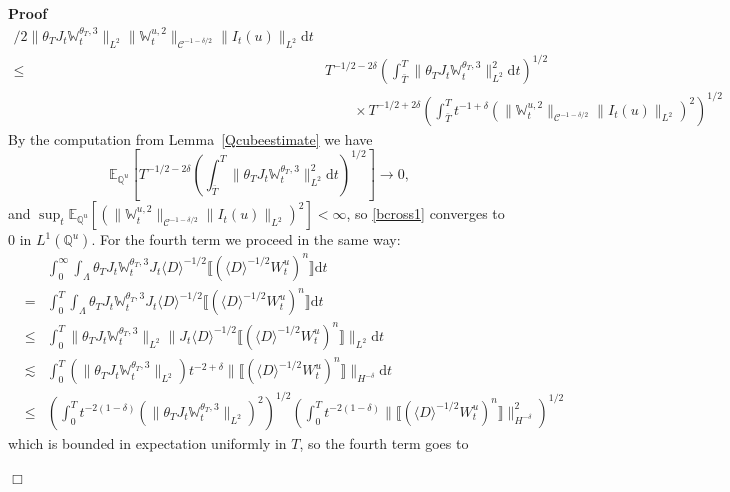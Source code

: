 \documentclass[11pt]{article}
\newcommand{\mathd}{\mathrm{d}}
\newenvironment{proof}{\noindent\textbf{Proof\ }}{\hspace*{\fill}$\Box$\medskip}
\begin{document}
\begin{proof}
\begin{equation}
\begin{array}{ll}
{      / 2} \| \theta_T J_t \mathbb{W}_t^{\theta_T, 3} \|_{L^2}  \|
      \mathbb{W}_t^{u, 2} \|_{\mathcal{C}^{- 1 - \delta / 2}} \| I_t (u)
      \|_{L^2} \mathd t\\
      \leqslant & T^{- 1 / 2 - 2 \delta} \left( \int^T_{\bar{T}} \| \theta_T
      J_t \mathbb{W}_t^{\theta_T, 3} \|^2_{L^2} \mathd t \right)^{1 / 2}\\
      & \qquad \times T^{- 1 / 2 + 2 \delta} \left( \int^T_{\bar{T}} t^{- 1 +
      \delta} (\| \mathbb{W}_t^{u, 2} \|_{\mathcal{C}^{- 1 - \delta / 2}} \|
      I_t (u) \|_{L^2})^2 \right)^{1 / 2}
    \end{array} \label{bcross1}
  \end{equation}
  By the computation from Lemma~\ref{Qcubeestimate} we have
  \[ \mathbb{E}_{\mathbb{Q}^u} \left[ T^{- 1 / 2 - 2 \delta} \left(
     \int^T_{\bar{T}} \| \theta_T J_t \mathbb{W}_t^{\theta_T, 3} \|^2_{L^2}
     \mathd t \right)^{1 / 2} \right] \rightarrow 0, \]
  and $\sup_t \mathbb{E}_{\mathbb{Q}^u} [(\| \mathbb{W}_t^{u, 2}
  \|_{\mathcal{C}^{- 1 - \delta / 2}} \| I_t (u) \|_{L^2})^2] < \infty$, so
  {\eqref{bcross1}} converges to $0$ in $L^1 (\mathbb{Q}^u)$. For the fourth
  term we proceed in the same way:
  \begin{eqnarray*}
    &  & \int^{\infty}_0 \int_{\Lambda} \theta_T J_t \mathbb{W}_t^{\theta_T,
    3} J_t \langle D \rangle^{- 1 / 2} \llbracket (\langle D \rangle^{- 1 / 2}
    W^u_t)^n \rrbracket \mathd t\\
    & = & \int^T_0 \int_{\Lambda} \theta_T J_t \mathbb{W}_t^{\theta_T, 3} J_t
    \langle D \rangle^{- 1 / 2} \llbracket (\langle D \rangle^{- 1 / 2}
    W^u_t)^n \rrbracket \mathd t\\
    & \leqslant & \int^T_0 \| \theta_T J_t \mathbb{W}_t^{\theta_T, 3}
    \|_{L^2} \| J_t \langle D \rangle^{- 1 / 2} \llbracket (\langle D
    \rangle^{- 1 / 2} W^u_t)^n \rrbracket \|_{L^2} \mathd t\\
    & \lesssim & \int^T_0 (\| \theta_T J_t \mathbb{W}_t^{\theta_T, 3}
    \|_{L^2}) t^{- 2 + \delta} \| \llbracket (\langle D \rangle^{- 1 / 2}
    W^u_t)^n \rrbracket \|_{H^{- \delta}} \mathd t\\
    & \leqslant & \left( \int^T_0 t^{- 2 (1 - \delta)} (\| \theta_T J_t
    \mathbb{W}_t^{\theta_T, 3} \|_{L^2})^2 \right)^{1 / 2} \left( \int^T_0
    t^{- 2 (1 - \delta)} \| \llbracket (\langle D \rangle^{- 1 / 2} W^u_t)^n
    \rrbracket \|^2_{H^{- \delta}} \right)^{1 / 2}
  \end{eqnarray*}
  which is bounded in expectation uniformly in $T$, so the fourth term goes to

\end{proof}
\end{document}
